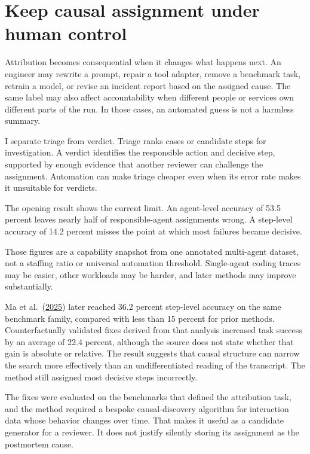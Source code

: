 \hypertarget{keep-causal-assignment-under-human-control}{%
\section{Keep causal assignment under human control}\label{keep-causal-assignment-under-human-control}}

Attribution becomes consequential when it changes what happens next. An engineer may rewrite a prompt, repair a tool adapter, remove a benchmark task, retrain a model, or revise an incident report based on the assigned cause. The same label may also affect accountability when different people or services own different parts of the run. In those cases, an automated guess is not a harmless summary.

I separate triage from verdict. Triage ranks cases or candidate steps for investigation. A verdict identifies the responsible action and decisive step, supported by enough evidence that another reviewer can challenge the assignment. Automation can make triage cheaper even when its error rate makes it unsuitable for verdicts.

The opening result shows the current limit. An agent-level accuracy of 53.5 percent leaves nearly half of responsible-agent assignments wrong. A step-level accuracy of 14.2 percent misses the point at which most failures became decisive.

Those figures are a capability snapshot from one annotated multi-agent dataset, not a staffing ratio or universal automation threshold. Single-agent coding traces may be easier, other workloads may be harder, and later methods may improve substantially.

Ma et al.~(\href{https://arxiv.org/abs/2509.08682}{2025}) later reached 36.2 percent step-level accuracy on the same benchmark family, compared with less than 15 percent for prior methods. Counterfactually validated fixes derived from that analysis increased task success by an average of 22.4 percent, although the source does not state whether that gain is absolute or relative. The result suggests that causal structure can narrow the search more effectively than an undifferentiated reading of the transcript. The method still assigned most decisive steps incorrectly.

The fixes were evaluated on the benchmarks that defined the attribution task, and the method required a bespoke causal-discovery algorithm for interaction data whose behavior changes over time. That makes it useful as a candidate generator for a reviewer. It does not justify silently storing its assignment as the postmortem cause.

